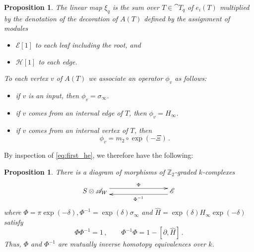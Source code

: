 \documentclass[english,letter paper,12pt,leqno]{article}
\newtheorem{proposition}[theorem]{Proposition}
\theoremstyle{example}
\numberwithin{equation}{section}
\def\be{\begin{equation}}
\def\ee{\end{equation}}
\def\nZ{\mathds{Z}}
\begin{document}
\begin{proposition} The linear map $\xi_q$ is the sum over $T \in \cat{T}_q$ of $e_i(T)$ multiplied by the denotation of the decoration of $A(T)$ defined by the assignment of modules
\begin{itemize}
\item $\mathscr{E}[1]$ to each leaf including the root, and
\item $\mathscr{H}[1]$ to each edge.
\end{itemize}
To each vertex $v$ of $A(T)$ we associate an operator $\phi_v$ as follows:
\begin{itemize}
\item if $v$ is an input, then $\phi_v = \sigma_\infty$.
\item if $v$ comes from an internal edge of $T$, then $\phi_v = H_\infty$.
\item if $v$ comes from an internal vertex of $T$, then
\[
\phi_v = m_2 \circ \exp(- \Xi)\,.
\]
\end{itemize}
\end{proposition}

By inspection of \eqref{eq:first_he}, we therefore have the following:

\begin{proposition}\label{prop:he_start} There is a diagram of morphisms of $\nZ_2$-graded $k$-complexes
\be\label{eq:he_start}
\xymatrix@C+5pc{
S \otimes \md{A}_W \ar@<1ex>[r]^-{\Phi} & \md{E}\ar@<1ex>[l]^-{\Phi^{-1}}
}
\ee
where $\Phi = \pi \exp(-\delta), \Phi^{-1} = \exp(\delta) \sigma_\infty$ and $\widehat{H} = \exp(\delta) H_\infty \exp(-\delta)$ satisfy
\be
\Phi \Phi^{-1} = 1\,, \qquad \Phi^{-1} \Phi = 1 - [\partial, \widehat{H}]\,.
\ee
Thus, $\Phi$ and $\Phi^{-1}$ are mutually inverse homotopy equivalences over $k$.
\end{proposition}

\newpage
\end{document}
